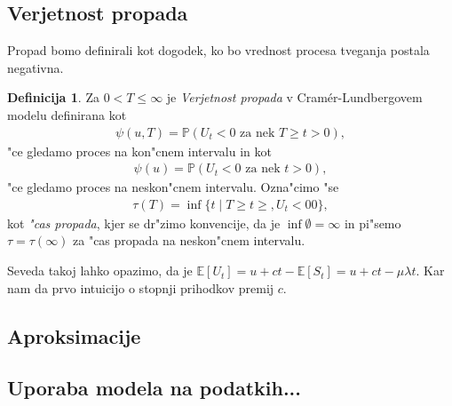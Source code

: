 \documentclass[12pt, a4paper, reqno]{amsart}
\theoremstyle{definition} %
\newtheorem{definicija}{Definicija}[section]
\theoremstyle{plain} %
\newcommand{\E}{\mathbb{E}}
\newcommand{\Prob}{\mathbb{P}}
\newcommand{\1}{\mathds{1}}
\begin{document}
    \subsection{Verjetnost propada}
        Propad bomo definirali kot dogodek, ko bo vrednost procesa tveganja postala negativna.

        \begin{definicija}
            Za $0<T\leq\infty$ je \textit{Verjetnost propada} v Cramér-Lundbergovem modelu definirana kot
            \begin{align*}
                \psi(u, T) = \Prob(U_t < 0 \text{ za nek } T \geq t > 0), 
            \end{align*}
            "ce gledamo proces na kon"cnem intervalu in kot
            \begin{align*}
                \psi(u) = \Prob(U_t < 0 \text{ za nek } t > 0),
            \end{align*}
            "ce gledamo proces na neskon"cnem intervalu. Ozna"cimo "se 
            \begin{align*}
                \tau(T)=\inf\{t\mid T\geq t\geq, U_t <0 0\}, 
            \end{align*}
            kot \textit{"cas propada}, kjer se dr"zimo konvencije, da je $\inf\emptyset = \infty$ in 
            pi"semo $\tau = \tau(\infty)$ za "cas propada na neskon"cnem intervalu.
            \label{def:verjetnostPropadaInCasiPropada}   
        \end{definicija}

        Seveda takoj lahko opazimo, da je $\E\left[U_t\right] = u + ct - \E\left[S_t\right] = u + ct - \mu\lambda t$.
        Kar nam da prvo intuicijo o stopnji prihodkov premij $c$.

    \subsection{Aproksimacije}

    \subsection{Uporaba modela na podatkih...}
\end{document}
